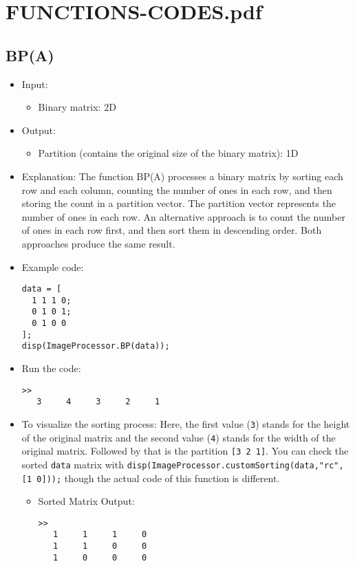 \documentclass[11pt]{amsart}
\theoremstyle{remark}
\providecommand{\tightlist}{%
  \setlength{\itemsep}{0pt}\setlength{\parskip}{0pt}}
\theoremstyle{definition}
\theoremstyle{remark}
\numberwithin{equation}{section}
\begin{document}



\section{FUNCTIONS-CODES.pdf}\label{functions-codes.pdf}

\subsection{BP(A)}\label{bpa}

\begin{itemize}
\item
  Input:

  \begin{itemize}
  \tightlist
  \item
    Binary matrix: 2D
  \end{itemize}
\item
  Output:

  \begin{itemize}
  \tightlist
  \item
    Partition (contains the original size of the binary matrix): 1D
  \end{itemize}
\item
  Explanation: The function BP(A) processes a binary matrix by sorting
  each row and each column, counting the number of ones in each row, and
  then storing the count in a partition vector. The partition vector
  represents the number of ones in each row. An alternative approach is
  to count the number of ones in each row first, and then sort them in
  descending order. Both approaches produce the same result.
\item
  Example code:

\begin{verbatim}
data = [
  1 1 1 0;
  0 1 0 1;
  0 1 0 0
];
disp(ImageProcessor.BP(data));
\end{verbatim}
\item
  Run the code:

\begin{verbatim}
>> 
   3     4     3     2     1
\end{verbatim}
\item
  To visualize the sorting process: Here, the first value (\texttt{3})
  stands for the height of the original matrix and the second value
  (\texttt{4}) stands for the width of the original matrix. Followed by
  that is the partition \texttt{{[}3\ 2\ 1{]}}. You can check the sorted
  \texttt{data} matrix with
  \texttt{disp(ImageProcessor.customSorting(data,"rc",{[}1\ 0{]}));}
  though the actual code of this function is different.

  \begin{itemize}
  \item
    Sorted Matrix Output:

\begin{verbatim}
>> 
   1     1     1     0
   1     1     0     0
   1     0     0     0
\end{verbatim}
  \end{itemize}
\end{itemize}
\end{document}
